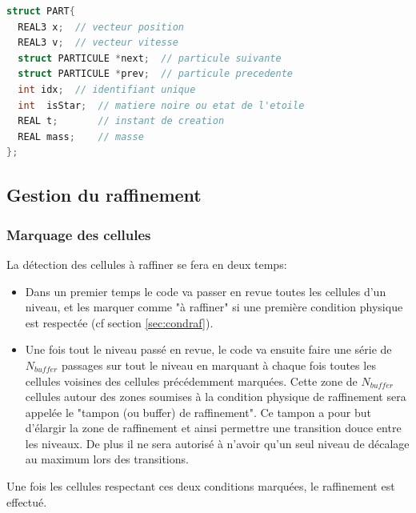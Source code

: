 \begin{lstlisting}[float=bth,language=C,frame=tb,caption={La structure PARTICULE de EMMA},label=lst:part]
struct PART{
  REAL3 x;  // vecteur position
  REAL3 v;  // vecteur vitesse
  struct PARTICULE *next;  // particule suivante
  struct PARTICULE *prev;  // particule precedente
  int idx;  // identifiant unique
  int  isStar;  // matiere noire ou etat de l'etoile
  REAL t;       // instant de creation
  REAL mass;    // masse
};
\end{lstlisting}


\subsection{Gestion du raffinement}
\label{sec:raffinement}

\subsubsection{Marquage des cellules}
La détection des cellules à raffiner se fera en deux temps:

\begin{itemize}
\item Dans un premier temps le code va passer en revue toutes les cellules d'un niveau, et les marquer comme "à raffiner" si une première condition physique est respectée (cf section \ref{sec:condraf}).

\item Une fois tout le niveau passé en revue, le code va ensuite faire une série de $N_{buffer}$ passages sur tout le niveau en marquant à chaque fois toutes les cellules voisines des cellules précédemment marquées.
Cette zone de $N_{buffer}$ cellules autour des zones soumises à la condition physique de raffinement sera appelée le "tampon (ou buffer) de raffinement".
Ce tampon a pour but d’élargir la zone de raffinement et ainsi permettre une transition douce entre les niveaux.
De plus il ne sera autorisé à n'avoir qu'un seul niveau de décalage au maximum lors des transitions.
\end{itemize}

Une fois les cellules respectant ces deux conditions marquées, le raffinement est effectué.


